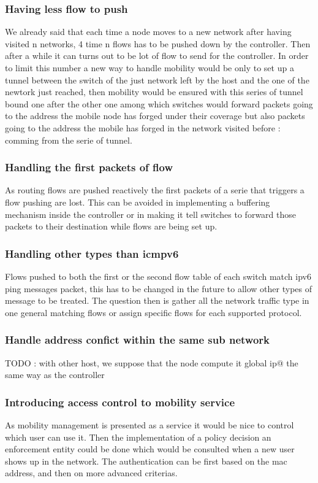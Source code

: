 \documentclass{article}
\begin{document}
\subsubsection{Having less flow to push}
We already said that each time a node moves to a new network after
having visited n networks, 4 time n flows has to be pushed down by the
controller. Then after a while it can turns out to be lot of flow to
send for the controller. In order to limit this number a new way to
handle mobility would be only to set up a tunnel between the switch
of the just network left by the host and the one of the newtork just
reached, then mobility would be ensured with this series of tunnel
bound one after the other one among which switches would forward
packets going to the address the mobile node has forged under their
coverage but also packets going to the address the mobile has forged in
the network visited before : comming from the serie of tunnel. 

\subsubsection{Handling the first packets of flow}
As routing flows are pushed reactively the first packets of a serie
that triggers a flow pushing are lost. This can be avoided in
implementing a buffering mechanism inside the controller or in making
it tell switches to forward those packets to their destination
while flows are being set up.

\subsubsection{Handling other types than icmpv6}
Flows pushed to both the first or the second flow table of each switch
match ipv6 ping messages packet, this has to be changed in the future
to allow other types of message to be treated. The question then is
gather all the network traffic type in one general matching flows or
assign specific flows for each supported protocol.


\subsubsection{Handle address confict within the same sub network}
    TODO : with other host, we suppose that the node compute it global ip@
    the same way as the controller

\subsubsection{Introducing access control to mobility service}
As mobility management is presented as a service it would be nice to
control which user can use it. Then the implementation of a policy
decision an enforcement entity could be done which would be consulted
when a new user shows up in the network. The authentication can be
first based on the mac address, and then on more advanced criterias. 
\end{document}
